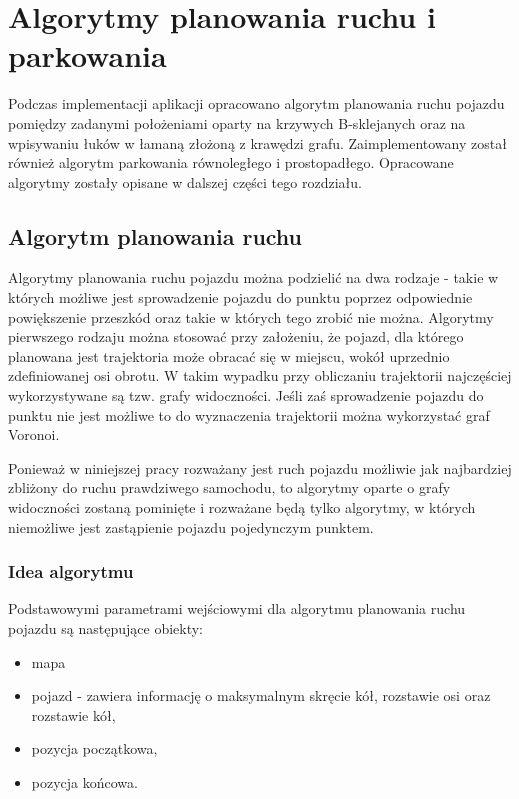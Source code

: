 \documentclass[a4paper,11pt,twoside]{report}
\theoremstyle{definition}
\begin{document}
\chapter{Algorytmy planowania ruchu i parkowania}

Podczas implementacji aplikacji opracowano algorytm planowania ruchu pojazdu pomiędzy zadanymi położeniami oparty na krzywych B-sklejanych oraz na wpisywaniu łuków w łamaną złożoną z krawędzi grafu. Zaimplementowany został również algorytm parkowania równoległego i prostopadłego. Opracowane algorytmy zostały opisane w dalszej części tego rozdziału.

\section{Algorytm planowania ruchu}

Algorytmy planowania ruchu pojazdu można podzielić na dwa rodzaje - takie w których możliwe jest sprowadzenie pojazdu do punktu poprzez odpowiednie powiększenie przeszkód oraz takie w których tego zrobić nie można. Algorytmy pierwszego rodzaju można stosować przy założeniu, że pojazd, dla którego planowana jest trajektoria może obracać się w miejscu, wokół uprzednio zdefiniowanej osi obrotu. W takim wypadku przy obliczaniu trajektorii najczęściej wykorzystywane są tzw. grafy widoczności. Jeśli zaś sprowadzenie pojazdu do punktu nie jest możliwe to do wyznaczenia trajektorii można wykorzystać graf Voronoi.

Ponieważ w niniejszej pracy rozważany jest ruch pojazdu możliwie jak najbardziej zbliżony do ruchu prawdziwego samochodu, to algorytmy oparte o grafy widoczności zostaną pominięte i rozważane będą tylko algorytmy, w których niemożliwe jest zastąpienie pojazdu pojedynczym punktem.

\subsection{Idea algorytmu}

Podstawowymi parametrami wejściowymi dla algorytmu planowania ruchu pojazdu są następujące obiekty:
\begin{itemize}
	\item mapa
	\item pojazd - zawiera informację o maksymalnym skręcie kół, rozstawie osi oraz rozstawie kół,
	\item pozycja początkowa,
	\item pozycja końcowa.
\end{itemize}
\end{document}
